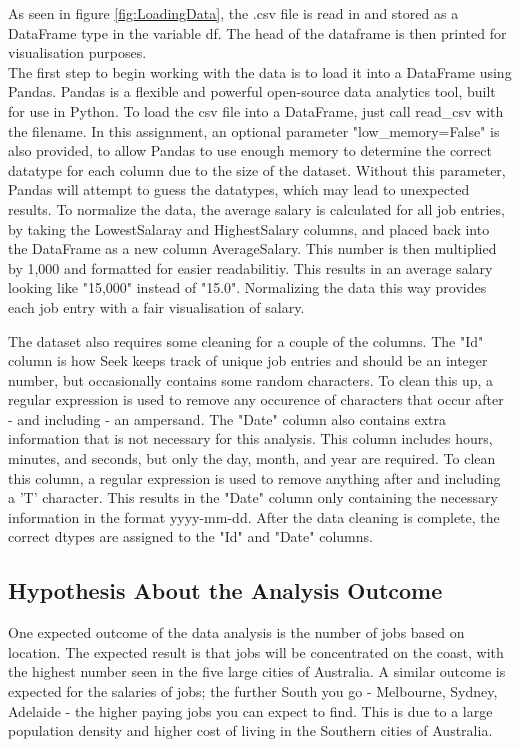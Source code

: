 \documentclass[twoside, 12pt, a4paper]{article}
\begin{document}
As seen in figure \ref{fig:LoadingData}, the .csv file is read in and stored as a DataFrame type in the variable df. The head of the dataframe is then printed for visualisation purposes.\\
The first step to begin working with the data is to load it into a DataFrame using Pandas. Pandas is a flexible and powerful open-source data analytics tool, built for use in Python. To load the csv file into a DataFrame, just call read\_csv with the filename. In this assignment, an optional parameter "low\_memory=False" is also provided, to allow Pandas to use enough memory to determine the correct datatype for each column due to the size of the dataset. Without this parameter, Pandas will attempt to guess the datatypes, which may lead to unexpected results. To normalize the data, the average salary is calculated for all job entries, by taking the LowestSalaray and HighestSalary columns, and placed back into the DataFrame as a new column AverageSalary. This number is then multiplied by 1,000 and formatted for easier readabilitiy. This results in an average salary looking like "15,000" instead of "15.0". Normalizing the data this way provides each job entry with a fair visualisation of salary.

The dataset also requires some cleaning for a couple of the columns. The "Id" column is how Seek keeps track of unique job entries and should be an integer number, but occasionally contains some random characters. To clean this up, a regular expression is used to remove any occurence of characters that occur after - and including - an ampersand. The "Date" column also contains extra information that is not necessary for this analysis. This column includes hours, minutes, and seconds, but only the day, month, and year are required. To clean this column, a regular expression is used to remove anything after and including a 'T' character. This results in the "Date" column only containing the necessary information in the format yyyy-mm-dd. After the data cleaning is complete, the correct dtypes are assigned to the "Id" and "Date" columns.

\subsection{Hypothesis About the Analysis Outcome}

One expected outcome of the data analysis is the number of jobs based on location. The expected result is that jobs will be concentrated on the coast, with the highest number seen in the five large cities of Australia. A similar outcome is expected for the salaries of jobs; the further South you go - Melbourne, Sydney, Adelaide - the higher paying jobs you can expect to find. This is due to a large population density and higher cost of living in the Southern cities of Australia.
\end{document}
